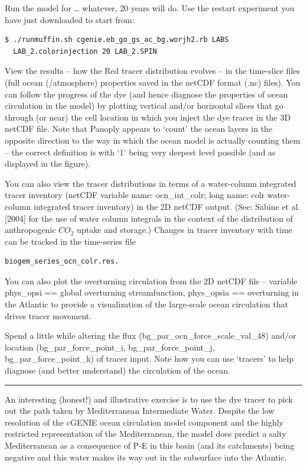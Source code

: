 \documentclass[11pt,fleqn]{book} %
\begin{document}
Run the model for … whatever, 20 years will do. Use the restart experiment you have just downloaded to start from: 

\begin{verbatim}
$ ./runmuffin.sh cgenie.eb_go_gs_ac_bg.worjh2.rb LABS
  LAB_2.colorinjection 20 LAB_2.SPIN
\end{verbatim}

View the results – how the Red tracer distribution evolves – in the time-slice files (full ocean (/atmosphere) properties saved in the netCDF format (.nc) files). You can follow the progress of the dye (and hence diagnose the properties of ocean circulation in the model) by plotting vertical and/or horizontal slices that go through (or near) the cell location in which you inject the dye tracer in the 3D netCDF file. Note that Panoply appears to ‘count’ the ocean layers in the opposite direction to the way in which the ocean model is actually counting them – the correct definition is with ‘1’ being very deepest level possible (and as displayed in the figure).

You can also view the tracer distributions in terms of a water-column integrated tracer inventory (netCDF variable name: ocn\_int\_colr; long name: colr water-column integrated tracer inventory) in the 2D netCDF output. (See: Sabine et al. [2004] for the use of water column integrals in the context of the distribution of anthropogenic \(CO_{2}\) uptake and storage.) Changes in tracer inventory with time can be tracked in the time-series file 

\begin{verbatim}
biogem_series_ocn_colr.res.
\end{verbatim}

You can also plot the overturning circulation from the 2D netCDF file – variable phys\_opsi == global overturning streamfunction, phys\_opsia == overturning in the Atlantic to provide a visualization of the large-scale ocean circulation that drives tracer movement.

Spend a little while altering the flux (bg\_par\_ocn\_force\_scale\_val\_48) and/or location (bg\_par\_force\_point\_i, bg\_par\_force\_point\_j, bg\_par\_force\_point\_k) of tracer input. Note how you can use ‘tracers’ to help diagnose (and better understand) the circulation of the ocean.

\hfill \break
\noindent\rule{4cm}{0.1mm}
\hfill \break

An interesting (honest!) and illustrative exercise is to use the dye tracer to pick out the path taken by Mediterranean Intermediate Water. Despite the low resolution of the cGENIE ocean circulation model component and the highly restricted representation of the Mediterranean, the model does predict a salty Mediterranean as a consequence of P-E in this basin (and its catchments) being negative and this water makes its way out in the subsurface into the Atlantic.
\end{document}
